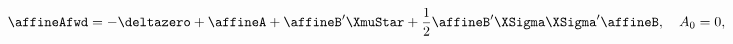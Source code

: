 \begin{equation*}
	\affineAfwd = - \deltazero + \affineA + \affineB' \XmuStar + \frac{1}{2} \affineB' \XSigma \XSigma' \affineB , \quad A_{0} = 0 ,
\end{equation*}